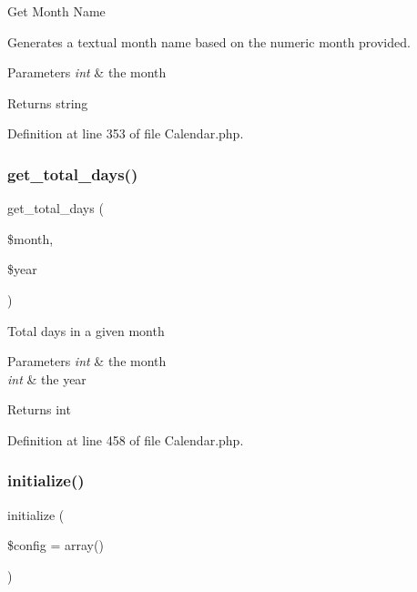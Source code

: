 Get Month Name

Generates a textual month name based on the numeric month provided.


\begin{DoxyParams}{Parameters}
{\em int} & the month \\
\hline
\end{DoxyParams}
\begin{DoxyReturn}{Returns}
string 
\end{DoxyReturn}


Definition at line 353 of file Calendar.\+php.

\mbox{\label{class_c_i___calendar_a3c863f62907e445af2711df11fb90ff9}} 
\subsubsection{\texorpdfstring{get\_total\_days()}{get\_total\_days()}}
{\footnotesize\ttfamily get\+\_\+total\+\_\+days (\begin{DoxyParamCaption}\item[{}]{\$month,  }\item[{}]{\$year }\end{DoxyParamCaption})}

Total days in a given month


\begin{DoxyParams}{Parameters}
{\em int} & the month \\
\hline
{\em int} & the year \\
\hline
\end{DoxyParams}
\begin{DoxyReturn}{Returns}
int 
\end{DoxyReturn}


Definition at line 458 of file Calendar.\+php.

\mbox{\label{class_c_i___calendar_a481385e36d920f5a5005ace05c6cd016}} 
\subsubsection{\texorpdfstring{initialize()}{initialize()}}
{\footnotesize\ttfamily initialize (\begin{DoxyParamCaption}\item[{}]{\$config = {\ttfamily array()} }\end{DoxyParamCaption})}

